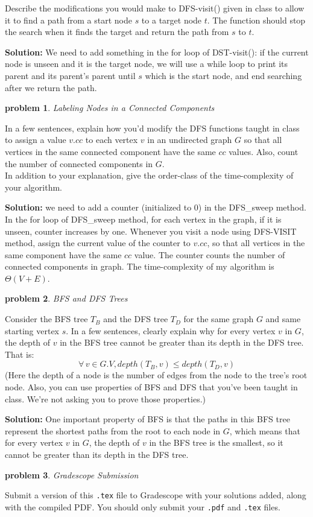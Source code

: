 \documentclass[10pt]{article}
\newcommand{\solution}[1]{\color{blue}\hfill\break\noindent\textbf{Solution:} #1\color{black}}
\newtheorem{problem}{\sc\color{cit}problem}
\begin{document}
Describe the modifications you would make to DFS-visit() given in class to allow it to find a path from a start node $s$ to a target node $t$. The function should stop the search when it finds the target and return the path from $s$ to $t$.

\solution{
    We need to add something in the for loop of DST-visit(): if the current node is unseen and it is the target node, we will use a while loop to print its parent and its parent's parent until $s$ which is the start node, and end searching after we return the path. 
}

\begin{problem} Labeling Nodes in a Connected Components \end{problem}

In a few sentences, explain how you'd modify the DFS functions taught in class to assign a value $v.cc$ to each vertex $v$ in an undirected graph $G$ so that all vertices in the same connected component have the same $cc$ values.  Also, count the number of connected components in $G$. \\
In addition to your explanation, give the order-class of the time-complexity of your algorithm.

\solution{
    we need to add a counter (initialized to $0$) in the DFS\_sweep method. In the for loop of DFS\_sweep method, for each vertex in the graph, if it is unseen, counter increases by one. Whenever you visit a node using DFS-VISIT method, assign the current value of the counter to $v.cc$, so that all vertices in the same component have the same $cc$ value. The counter counts the number of connected components in graph. The time-complexity of my algorithm is $\Theta (V+E)$.
}


\begin{problem} BFS and DFS Trees \end{problem}

Consider the BFS tree $T_B$ and the DFS tree $T_D$ for the same graph $G$ and same starting vertex $s$.
In a few sentences, clearly explain why for every vertex $v$ in $G$, the depth of $v$ in the BFS tree cannot be greater than its depth in the DFS tree. That is:
$$ \forall \, v \in G.V, depth(T_B, v) \leq depth(T_D, v)$$
(Here the depth of a node is the number of edges from the node to the tree's root node. Also, you can use properties of BFS and DFS that you've been taught in class. We're not asking you to prove those properties.)

\solution{
    One important property of BFS is that the paths in this BFS tree represent the shortest paths from the root to each node in $G$, which means that for every vertex $v$ in $G$, the depth of $v$ in the BFS tree is the smallest, so it cannot be greater than its depth in the DFS tree.
}


\begin{problem} Gradescope Submission \end{problem}
Submit a version of this \verb|.tex| file to Gradescope with your solutions added, along with the compiled PDF.  You should only submit your \verb|.pdf| and \verb|.tex| files.
\end{document}
